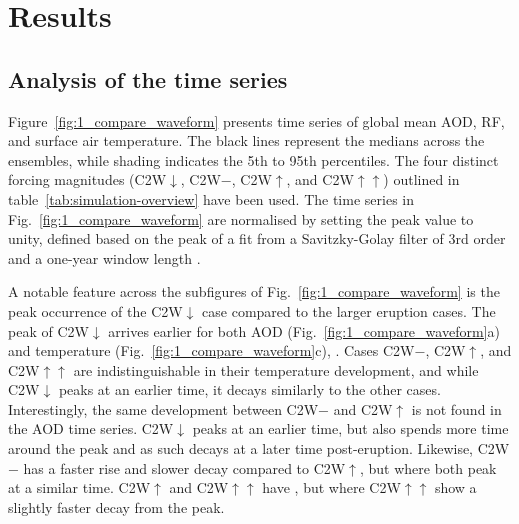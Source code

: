 \documentclass[draft]{agujournal2019}
\begin{document}
  \section{Results}

  \label{sec:results}


  \subsection{Analysis of the time series}

  Figure~\ref{fig:1_compare_waveform} presents time series of global mean AOD, RF, and
  surface air temperature. The black lines represent the medians across the ensembles,
  while shading indicates the 5th to 95th percentiles. The four distinct forcing
  magnitudes (C2W\(\downarrow\), C2W\(-\), C2W\(\uparrow\), and C2W\(\uparrow\uparrow\))
  outlined in table~\ref{tab:simulation-overview} have been used. The time series in
  Fig.~\ref{fig:1_compare_waveform} are normalised by setting the peak value to unity,
  defined based on the peak of a fit from a Savitzky-Golay filter of 3rd order and a
  one-year window length \cite{savitzky1964}.

  A notable feature across the subfigures of Fig.~\ref{fig:1_compare_waveform} is the
  peak occurrence of the C2W\(\downarrow\) case compared to the larger eruption cases.
  The peak of C2W\(\downarrow\) arrives earlier for both AOD
  (Fig.~\ref{fig:1_compare_waveform}a) and temperature
  (Fig.~\ref{fig:1_compare_waveform}c), .
  Cases C2W\(-\), C2W\(\uparrow\), and C2W\(\uparrow\uparrow\) are indistinguishable in
  their temperature development, and while C2W\(\downarrow\) peaks at an earlier time,
  it decays similarly to the other cases. Interestingly, the same development between
  C2W\(-\) and C2W\(\uparrow\) is not found in the AOD time series. C2W\(\downarrow\)
  peaks at an earlier time, but also spends more time around the peak and as such decays
  at a later time post-eruption. Likewise, C2W\(-\) has a faster rise and slower decay
  compared to C2W\(\uparrow\), but where both peak at a similar time. C2W\(\uparrow\)
  and C2W\(\uparrow\uparrow\) have , but where C2W\(\uparrow\uparrow\) show a slightly faster decay
  from the peak.
\end{document}
